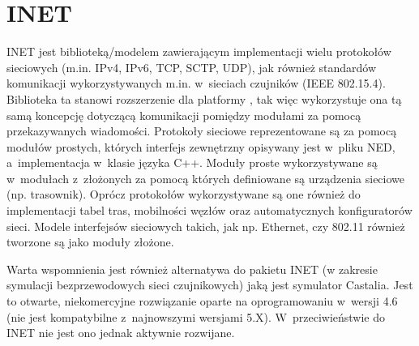\section{INET}
INET jest biblioteką/modelem zawierającym implementacji wielu protokołów sieciowych (m.in. IPv4, IPv6, TCP, SCTP, UDP), jak również standardów komunikacji wykorzystywanych m.in. w~sieciach czujników (IEEE 802.15.4)\cite{inet}. Biblioteka ta stanowi rozszerzenie dla platformy \omnetpp, tak więc wykorzystuje ona tą samą koncepcję dotyczącą komunikacji pomiędzy modułami za pomocą przekazywanych wiadomości. Protokoły sieciowe reprezentowane są za pomocą modułów prostych, których interfejs zewnętrzny opisywany jest w~pliku NED, a~implementacja w~klasie języka C++. Moduły proste wykorzystywane są w~modułach z~złożonych za pomocą których definiowane są urządzenia sieciowe (np. trasownik). Oprócz protokołów wykorzystywane są one również do implementacji tabel tras, mobilności węzłów oraz automatycznych konfiguratorów sieci. Modele interfejsów sieciowych takich, jak np. Ethernet, czy 802.11 również tworzone są jako moduły złożone.

Warta wspomnienia jest również alternatywa do pakietu INET (w zakresie symulacji bezprzewodowych sieci czujnikowych) jaką jest symulator Castalia. Jest to otwarte, niekomercyjne rozwiązanie oparte na oprogramowaniu \omnetpp w~wersji 4.6 (nie jest kompatybilne z~najnowszymi wersjami \omnetpp 5.X). W~przeciwieństwie do INET nie jest ono jednak aktywnie rozwijane. 
